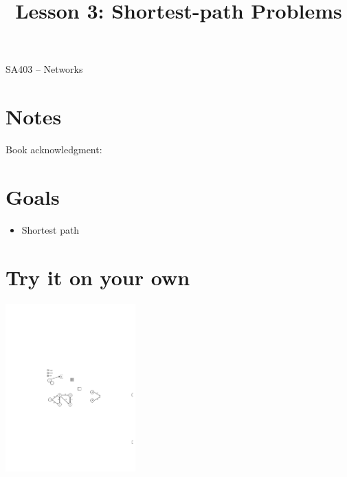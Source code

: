 \documentclass[12pt]{article}
\makeatletter
\theoremstyle{definition}
\newcommand{\graphbox}[5]%
{
\begin{tikzpicture}
     [>=latex,scale=#5]
     
     \draw [->,very thick] (#1, 0) -- (#2, 0) node[right] {$x$};
     \draw [->,very thick] (0, #3) -- (0, #4) node[above] {$y$};
     
     \draw[step=1cm,thick,dotted] (#1,#3) grid (#2,#4);
   \end{tikzpicture}
   }
\renewcommand{\maketitle}{
  \noindent SA403 -- Networks \\

  \begin{center}\Large{\textbf{\@title}}\end{center}
}
\makeatother
\begin{document}

\title{Lesson 3: Shortest-path Problems}


\maketitle


\section*{Notes}

Book acknowledgment:
\section*{Goals}
\begin{itemize}
\item Shortest path 
\end{itemize}




\section{Try it on your own}

\begin{center}
\includegraphics[width=5cm]{shortestpathexample1}
\end{center}
\end{document}
